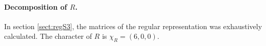 \begin{example}
	\paragraph{Decomposition of $R$.} In section \ref{sect:regS3}, the matrices of the regular representation was exhaustively calculated. The character of $R$ is $\chi_R = (6,0,0)$.%
	

\end{example}
